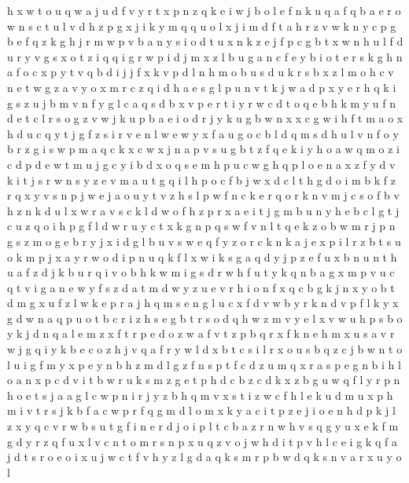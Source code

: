 \documentclass{article}
\begin{document}
h x w t o u q
w a j
u d f v y r t x p n z q k e i w j b o
l e f n k u q a
f q b a e r o w n s c t u l v d h z p g x j i k y m
q
q u o l x j i m d f t a h r z v w k n y c p g b
e f q z k g h j r m w p v b a n y s i o d t u x
n
k z e j f p c g b t x w n h u l
f d u r y v g s x o t z i q
q i g r w p
i d j m x z l b u g a n c f e
y b i o t
e r s k g h n a f o c x p y t v q b d i j
j f x k v p d l n h m o b u s
d u k r s b x z l m o h c v n e t w
g z a v
y o x m r c z q i d h a e s g l p u n v t k j
w a d p x y e r h q k i g s z u j b m v n f
y
g l c a q s d b x v p e r t
i y r
w c d t o q e
b h k m y u f n d e t c l r s o g z v w
j k u p b a e
i o d r j y k u g b w n x
x c g w i h f t m
a o x h d u c q y t j g f z s i r v e n l w
e w y x f a u g o c b l d q m s
d h u l v n f o y b r z g i s w p m a q c k x
c w x j n a p v s u g b t z f q e k i y h o
a
w q m o z i c d
p d e w t m u j g c
y i b d x o q s e m h p u c w
g h q p l o e n a x z f y d v k i t j s r w
n s y z e v m a u t g q i l h p o c f b j w x d
c l t h g d o i m b k f z r q x y v s n p j w e
j a o u y t v z h s l p w f n c k e r q
o r k n v
m j c s o f b v h z n k d u l x w r a
v s c k l d w o f h z p r x a e i t j g m b u n y
h e b c l g
t j c u z q o i h p g f l d w
r u y c t x k g n p q s w f v
n
l t q e k z o b w m r j p n g s
z m o g e b r y
j x i d g l b u v s w e q f y z o r c k
n k a j e x p
i l r z b t s u o k m p j x
a y r w o d i p n u q k f l
x
w i k s g a q d y j p z e f u x b n
u n t h
u a
f z d j k b u r q i v
o b h k w m i g
s d r w h f u t y k q n b a g x m p v
u c q t v i g a n e w y f s z d
a t m d w y z u e v r h i o n f x q c b g k j
n x
y o b t d m g x u f z l w k e p r a j
h q m s e n g l u c x f d v w b y r k
n d v p
f l k y x g d w n a q p u o t b c r i z h s e
g b t r s o d q h w z m v y e l x
v w u h p s b o y k j d n q a l e m z x f t r
p e d o z w a f v t
z p b q r x f k n e
h m x u s a v r w j g q i y k b e c o z
h j v q a f r y w l d x b t c s
i l r x o u s b
q z c j b w n t o l u i g f m y x p e
y n b h z m
d l g z f n s p t
f c d z u m q x r a s p e g n b i h l
o
a n x p c d v i t b w r u k s m z g
e t p h d c b z
c d k x z b g u w q f l y r p n h o e t s j a
a g l c w p n i r j y z b h q m v x
s t i z w c f h l e k u d m
u x p h m i v t r s j k b f a c
w p r f q g m d l o
m x k y a c i t p z e
j
i o e n h d p k j l z x y q c v r w b s u t g f
i
n e r
d j o i p l t c b a z r n w h v s q g y u x e k f m
g d y r z q f u x l v c n t o
m r s n p x u q z v o j w h d i t
p v h l c e i g k q f a j d t s r o
e o i x u j w c t f v h y z l g d a q k s m r p b
w d q k s n v a r x u y o l
\end{document}
